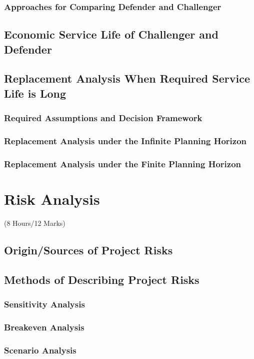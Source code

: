 \documentclass[12pt]{article}
\begin{document}
	\subsubsection{Approaches for Comparing Defender and Challenger}
	\subsection{Economic Service Life of Challenger and Defender}
	\subsection{Replacement Analysis When Required Service Life is Long}
	\subsubsection{Required Assumptions and Decision Framework}
	\subsubsection{Replacement Analysis under the Infinite Planning Horizon}
	\subsubsection{Replacement Analysis under the Finite Planning Horizon}

	\pagebreak
\section{Risk Analysis}
	\begin{center}(8 Hours/12 Marks)\end{center}
	\subsection{Origin/Sources of Project Risks}
	\subsection{Methods of Describing Project Risks}
	\subsubsection{Sensitivity Analysis}
	\subsubsection{Breakeven Analysis}
	\subsubsection{Scenario Analysis}
\end{document}
